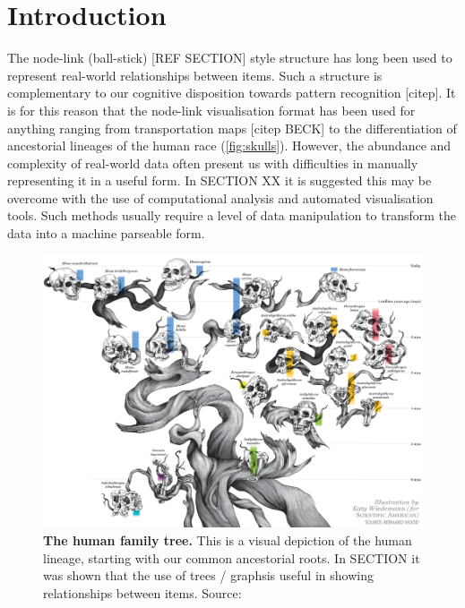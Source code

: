

\section{Introduction}
The node-link (ball-stick) [REF SECTION] style structure has long been used to represent real-world relationships between items. Such a structure is complementary to our cognitive disposition towards pattern recognition [citep]. It is for this reason that the node-link visualisation format has been used for anything ranging from transportation maps [citep BECK] to the differentiation of ancestorial lineages of the human race (\autoref{fig:skulls}). However, the abundance and complexity of real-world data often present us with difficulties in manually representing it in a useful form. In SECTION XX it is suggested this may be overcome with the use of computational analysis and automated visualisation tools. Such methods usually require a level of data manipulation to transform the data into a machine parseable form. 

\begin{figure}[H]
     \centering
         \includegraphics[width=\textwidth]{figures_c3/humanskulls.png}

        \caption[Caption for LOF]{\textbf{The human family tree.} This is a visual depiction of the human lineage, starting with our common ancestorial roots. In SECTION it was shown that the use of trees / graphs\protect\footnotemark is useful in showing relationships between items. Source: \citep{skull}}
        \label{fig:skulls}
\end{figure}



